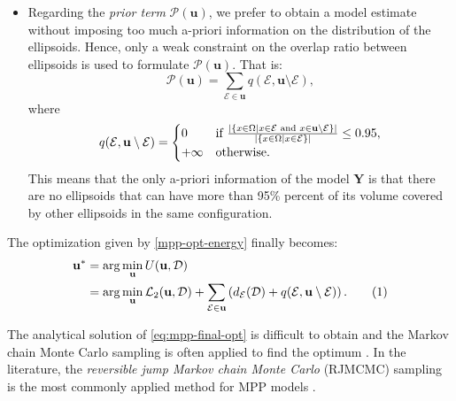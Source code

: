 \documentclass[journal]{IEEEtran}
\newcommand\numberthis{\addtocounter{equation}{1}\tag{\theequation}}%
\begin{document}
\begin{itemize}
\item Regarding the \textit{prior term} $\mathcal{P} (\mathbf{u})$, we
  prefer to obtain a model estimate without imposing too much a-priori
  information on the distribution of the ellipsoids. Hence, only a
  weak constraint on the overlap ratio between ellipsoids is used to
  formulate $\mathcal{P} (\mathbf{u})$. That is:
  \begin{equation}
    \label{eq:prior-term}
    \mathcal{P} (\mathbf{u}) = \sum_{\mathcal{E} \in \mathbf{u}}
    q(\mathcal{E}, \mathbf{u} \setminus \mathcal{E}),
  \end{equation}
  where
  \begin{equation}
    \label{eq:prior-term-detail}
    q(\mathcal{E}, \mathbf{u} \setminus \mathcal{E}) =
    \begin{cases}
      0 & \textnormal{if }\frac{ | \{ x \in \Omega | x \in \mathcal{E}
        \textnormal{ and } x \in \mathbf{u} \setminus \mathcal{E} \}
        |} { | \{ x \in \Omega | x \in \mathcal{E} \} |}
      \le 0.95, \\
      +\infty & \textnormal{otherwise}.
    \end{cases}
  \end{equation}
  This means that the only a-priori information of the model
  $\mathbf{Y}$ is that there are no ellipsoids that can have more than
  95\% percent of its volume covered by other ellipsoids in the same
  configuration.

\end{itemize}

The optimization given by \eqref{mpp-opt-energy} finally becomes:
\begin{align*}
  \label{eq:mpp-final-opt}
  \mathbf{u}^{*}
  & = \arg \min_{\mathbf{u}} U(\mathbf{u}, \mathcal{D}) \\
  & = \arg \min_{\mathbf{u}} \mathcal{L}_{2}(\mathbf{u},
    \mathcal{D}) + \sum_{\mathcal{E} \in \mathbf{u}} \left(
    d_{\mathcal{E}} (\mathcal{D}) + q(\mathcal{E}, \mathbf{u}
    \setminus \mathcal{E}) \right). \numberthis
\end{align*}

The analytical solution of \eqref{eq:mpp-final-opt} is difficult to
obtain and the Markov chain Monte Carlo sampling is often applied to
find the optimum \cite{lafarge2010geometric}. In the literature, the
\textit{reversible jump Markov chain Monte Carlo} (RJMCMC) sampling is
the most commonly applied method for MPP models
\cite{geyer1994simulation} \cite{green1995reversible}
\cite{tu2002image} \cite{descombes2009object} \cite{ge2009marked}
\cite{lafarge2010geometric} \cite{utasi20113}
\cite{sirinukunwattana2015stochastic}.
\end{document}
